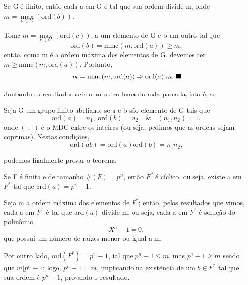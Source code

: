 \documentclass[../algebraIII_notes.tex]{subfiles}
\begin{document}
\begin{lemma*}
	Se G é finito, então cada a em G é tal que sua ordem divide m, onde \(m=\max\limits_{b\in G}(\mathrm{ord}(b))\).
\end{lemma*}
\begin{proof*}
	Tome \(m = \max\limits_{c\in G}(\mathrm{ord}(c))\), a um elemento de G e b um outro tal que
	\[
		\mathrm{ord}(b) = \mathrm{mmc}(m, \mathrm{ord}(a)) \geq m;
	\]
	então, como m é a ordem máxima dos elementos de G, devemos ter \(m\geq \mathrm{mmc}(m, \mathrm{ord}(a))\). Portanto,
	\[
		m = \mathrm{mmc}(m, \mathrm{ord}(a)) \Rightarrow \mathrm{ord}(a)| m. \text{ $\blacksquare$}
	\]
\end{proof*}

Juntando os resultados acima ao outro lema da aula passada, isto é, ao
\begin{lemma*}
	Seja G um grupo finito abeliano; se a e b são elemento de G tais que
	\[
		\mathrm{ord}(a)=n_{1},\; \mathrm{ord}(b)=n_2 \quad\&\quad (n_1, n_2)=1,
	\]
	onde \((\cdot , \cdot )\) é o MDC entre os inteiros (ou seja, pedimos que as ordens sejam coprimas). Nestas condições,
	\[
		\mathrm{ord}(ab)=\mathrm{ord}(a)\mathrm{ord}(b)=n_1 n_2,
	\]
\end{lemma*}
podemos finalmente provar o teorema
\begin{theorem*}
	Se F é finito e de tamanho \(\#(F)=p^{n}\), então \(F^{*}\) é cíclico, ou seja, existe a em \(F^{*}\) tal que \(\mathrm{ord}(a) = p^{n}-1\).
\end{theorem*}
\begin{proof*}
	Seja m a ordem máxima dos elementos de \(F^{*}\); então, pelos resultados que vimos, cada a em \(F^{*}\) é tal que \(\mathrm{ord}(a)\) divide m, ou seja, cada a em \(F^{*}\) é solução do polinômio
	\[
		X^{n}-1 = 0,
	\]
	que possui um número de raízes menor ou igual a m.

	Por outro lado, \(\mathrm{ord}(F^{*})=p^{n}-1\), tal que \(p^{n}-1 \leq m\), mas \(p^{n}-1 \geq m\) sendo que \(m | p^{n}-1\); logo, \(p^{n}-1 = m\), implicando na existência de um \(b\in F^{*}\) tal que sua ordem é \(p^{n}-1\), provando o resultado. \qedsymbol
\end{proof*}
\end{document}
